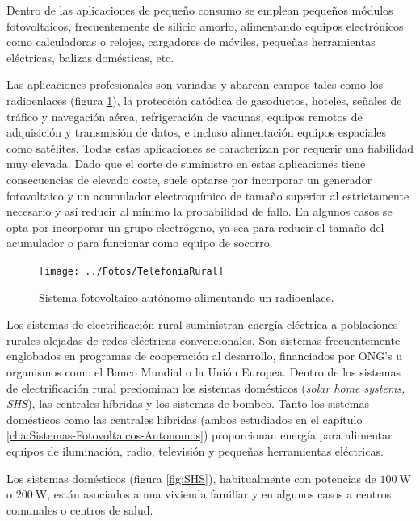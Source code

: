 Dentro de las aplicaciones de pequeño consumo se emplean pequeños
módulos fotovoltaicos, frecuentemente de silicio amorfo, alimentando
equipos electrónicos como calculadoras o relojes, cargadores de móviles,
pequeñas herramientas eléctricas, balizas domésticas, etc. 

Las aplicaciones profesionales son variadas y abarcan campos tales
como los radioenlaces (figura \ref{fig:SistemaRadioenlace}), la protección
catódica de gasoductos, hoteles, señales de tráfico y navegación aérea,
refrigeración de vacunas, equipos remotos de adquisición y transmisión
de datos, e incluso alimentación equipos espaciales como satélites.
Todas estas aplicaciones se caracterizan por requerir una fiabilidad
muy elevada. Dado que el corte de suministro en estas aplicaciones
tiene consecuencias de elevado coste, suele optarse por incorporar
un generador fotovoltaico y un acumulador electroquímico de tamaño
superior al estrictamente necesario y así reducir al mínimo la probabilidad
de fallo. En algunos casos se opta por incorporar un grupo electrógeno,
ya sea para reducir el tamaño del acumulador o para funcionar como
equipo de socorro.

%
\begin{figure}
\begin{centering}
\texttt{[image: ../Fotos/TelefoniaRural]}
\end{centering}

\caption{Sistema fotovoltaico autónomo alimentando un radioenlace.\label{fig:SistemaRadioenlace}}

\end{figure}


Los sistemas de electrificación rural suministran energía eléctrica
a poblaciones rurales alejadas de redes eléctricas convencionales.
Son sistemas frecuentemente englobados en programas de cooperación
al desarrollo, financiados por ONG's u organismos como el Banco Mundial
o la Unión Europea. Dentro de los sistemas de electrificación rural
predominan los sistemas domésticos (\emph{solar home systems, SHS}),
las centrales híbridas y los sistemas de bombeo. Tanto los sistemas
domésticos como las centrales híbridas (ambos estudiados en el capítulo
\ref{cha:Sistemas-Fotovoltaicos-Autonomos}) proporcionan energía
para alimentar equipos de iluminación, radio, televisión y pequeñas
herramientas eléctricas. 

Los sistemas domésticos (figura \ref{fig:SHS}),
habitualmente con potencias de $\SI{100}{\watt}$ o $\SI{200}{\watt}$,
están asociados a una vivienda familiar y en algunos casos a centros
comunales o centros de salud. 

